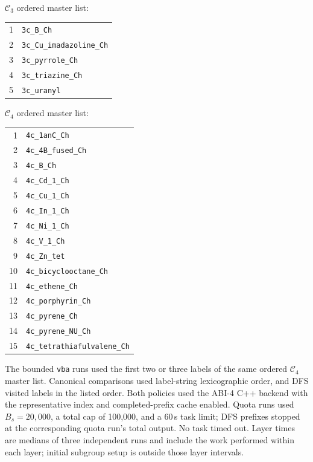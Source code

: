 \documentclass[a5paper, 10pt]{article}
\begin{document}
\noindent $\mathcal{C}_{3}$ ordered master list:
\begin{center}\small
\begin{tabular}{rl}
1 & \texttt{3c\_B\_Ch} \\
2 & \texttt{3c\_Cu\_imadazoline\_Ch} \\
3 & \texttt{3c\_pyrrole\_Ch} \\
4 & \texttt{3c\_triazine\_Ch} \\
5 & \texttt{3c\_uranyl} \\
\end{tabular}
\end{center}

\noindent $\mathcal{C}_{4}$ ordered master list:
\begin{center}\small
\begin{tabular}{rl}
1 & \texttt{4c\_1anC\_Ch} \\
2 & \texttt{4c\_4B\_fused\_Ch} \\
3 & \texttt{4c\_B\_Ch} \\
4 & \texttt{4c\_Cd\_1\_Ch} \\
5 & \texttt{4c\_Cu\_1\_Ch} \\
6 & \texttt{4c\_In\_1\_Ch} \\
7 & \texttt{4c\_Ni\_1\_Ch} \\
8 & \texttt{4c\_V\_1\_Ch} \\
9 & \texttt{4c\_Zn\_tet} \\
10 & \texttt{4c\_bicyclooctane\_Ch} \\
11 & \texttt{4c\_ethene\_Ch} \\
12 & \texttt{4c\_porphyrin\_Ch} \\
13 & \texttt{4c\_pyrene\_Ch} \\
14 & \texttt{4c\_pyrene\_NU\_Ch} \\
15 & \texttt{4c\_tetrathiafulvalene\_Ch} \\
\end{tabular}
\end{center}

The bounded \texttt{vba} runs used the first two or three labels of the same ordered $\mathcal C_4$ master list. Canonical comparisons used label-string lexicographic order, and DFS visited labels in the listed order. Both policies used the ABI-4 C++ backend with the representative index and completed-prefix cache enabled. Quota runs used $B_s=20{,}000$, a total cap of 100,000, and a 60\,s task limit; DFS prefixes stopped at the corresponding quota run's total output. No task timed out. Layer times are medians of three independent runs and include the work performed within each layer; initial subgroup setup is outside those layer intervals.
\end{document}

